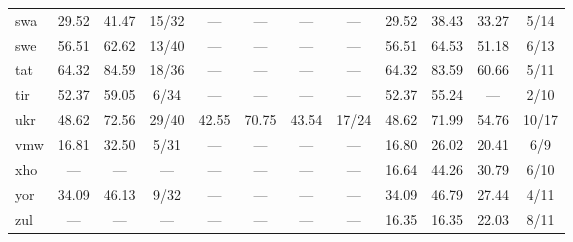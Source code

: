 \begin{table*}[h]
{\begin{tabular}{l|ccc|cccc|cccc}
            swa               & 29.52                        & 41.47                        & 15/32                       & —              & —                   & —                & —             & 29.52          & 38.43               & 33.27            & 5/14          \\
            swe               & 56.51                        & 62.62                        & 13/40                       & —              & —                   & —                & —             & 56.51          & 64.53               & 51.18            & 6/13          \\
            tat               & 64.32                        & 84.59                        & 18/36                       & —              & —                   & —                & —             & 64.32          & 83.59               & 60.66            & 5/11          \\
            tir               & 52.37                        & 59.05                        & 6/34                        & —              & —                   & —                & —             & 52.37          & 55.24               & —                & 2/10          \\
            ukr               & 48.62                        & 72.56                        & 29/40                       & 42.55          & 70.75               & 43.54            & 17/24         & 48.62          & 71.99               & 54.76            & 10/17         \\
            vmw               & 16.81                        & 32.50                        & 5/31                        & —              & —                   & —                & —             & 16.80          & 26.02               & 20.41            & 6/9           \\
            xho               & —                            & —                            & —                           & —              & —                   & —                & —             & 16.64          & 44.26               & 30.79            & 6/10          \\
            yor               & 34.09                        & 46.13                        & 9/32                        & —              & —                   & —                & —             & 34.09          & 46.79               & 27.44            & 4/11          \\
            zul               & —                            & —                            & —                           & —              & —                   & —                & —             & 16.35          & 16.35               & 22.03            & 8/11          \\
            \hline
        \end{tabular}
    }
\end{table*}
